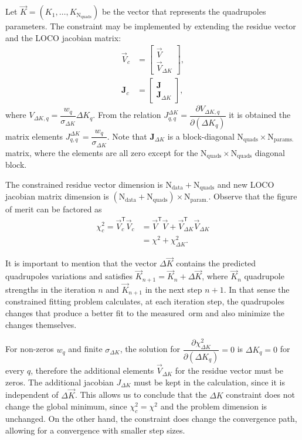 Let $\vec{K} = \left(K_1, \ldots, K_{\mathrm{N}_{\mathrm{quads}}}\right)$ be the vector that represents the quadrupoles parameters. The constraint may be implemented by extending the residue vector and the LOCO jacobian matrix:
\begin{align}
    \vec{V}_c &= \begin{bmatrix}
    \vec{V} \\
    \vec{V}_{\Delta K}
    \end{bmatrix}, \\
    \mathbf{J}_c &= 
    \begin{bmatrix}
    \mathbf{J} \\
    \mathbf{J}_{\Delta K}
    \end{bmatrix},
\end{align}
where $V_{\Delta K, q} = \dfrac{w_q}{\sigma_{\Delta K}}\Delta K_q$. From the relation $J_{q, q}^{\Delta K} = \dfrac{\partial V_{\Delta K, q}}{\partial \left(\Delta K_q\right)}$ it is obtained the matrix elements $J_{q, q}^{\Delta K} = \dfrac{w_q}{\sigma_{\Delta K}}$. Note that $\mathbf{J}_{\Delta K}$ is a block-diagonal $\mathrm{N}_{\mathrm{quads}} \times \mathrm{N}_{\mathrm{params.}}$ matrix, where the elements are all zero except for the $\mathrm{N}_{\mathrm{quads}} \times \mathrm{N}_{\mathrm{quads}}$ diagonal block.

The constrained residue vector dimension is $\mathrm{N}_{\mathrm{data}} + \mathrm{N}_{\mathrm{quads}}$ and new LOCO jacobian matrix dimension is $\left(\mathrm{N}_{\mathrm{data}} + \mathrm{N}_{\mathrm{quads}}\right) \times \mathrm{N}_{\mathrm{param.}}$. Observe that the figure of merit can be factored as
\begin{align*}
    \chi_c^2 = \vec{V}_c^{\mathsf{T}}\vec{V}_c &= \vec{V}^{\mathsf{T}}\vec{V} + \vec{V}_{\Delta K}^{\mathsf{T}}\vec{V}_{\Delta K} \\ 
    &= \chi^2 + \chi^2_{\Delta K}.
\end{align*}

It is important to mention that the vector $\Delta \vec{K}$ contains the predicted quadrupoles variations and satisfies $\vec{K}_{n+1} = \vec{K}_n + \Delta \vec{K}$, where $\vec{K}_n$ quadrupole strengths in the iteration $n$ and $\vec{K}_{n+1}$ in the next step $n+1$. In that sense the constrained fitting problem calculates, at each iteration step, the quadrupoles changes that produce a better fit to the measured~\gls{orm} and also minimize the changes themselves. 

For non-zeros $w_q$ and finite $\sigma_{\Delta K}$, the solution for $\dfrac{\partial \chi^2_{\Delta K}}{\partial \left(\Delta K_q\right)} = 0$ is $\Delta K_q = 0$ for every $q$, therefore the additional elements $\vec{V}_{\Delta K}$ for the residue vector must be zeros. The additional jacobian $J_{\Delta K}$ must be kept in the calculation, since it is independent of $\Delta \vec{K}$. This allows us to conclude that the $\Delta K$ constraint does not change the global minimum, since $\chi^2_c = \chi^2$ and the problem dimension is unchanged. On the other hand, the constraint does change the convergence path, allowing for a convergence with smaller step sizes.

